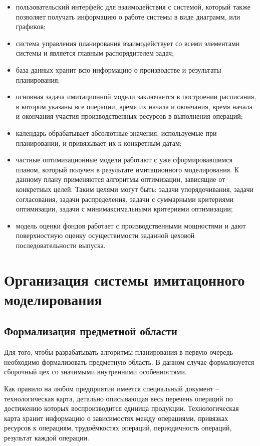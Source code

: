 \begin{itemize}
    \item пользовательский интерфейс для взаимодействия с системой, который также позволяет получать информацию о работе системы в виде диаграмм, или графиков; 
    \item система управления планирования взаимодействует со всеми элементами системы и является главным распорядителем задач;
    \item база данных хранит всю информацию о производстве и результаты планирования; 
    \item основная задача имитационной модели заключается в построении расписания, в котором указаны все операции, время их начала и окончания, время начала и окончания участия производственных ресурсов в выполнения операций;
    \item календарь обрабатывает абсолютные значения, используемые при планировании, и привязывает их к конкретным датам;
    \item частные оптимизационные модели работают с уже сформировавшимся планом, который получен в результате имитационного моделирования. К данному плану применяются алгоритмы оптимизации, зависящие от конкретных целей. Таким целями могут быть: задачи упорядочивания, задачи согласования, задачи распределения, задачи с суммарными критериями оптимизации, задачи с минимаксимальными критериями оптимизации;
    \item модель оценки фондов работает с производственными мощностями и дают поверхностную оценку осуществимости заданной цеховой последовательности выпуска.
\end{itemize}

\section{Организация системы имитацонного моделирования}

\subsection{Формализация предметной области}

Для того, чтобы разрабатывать алгоритмы планирования в первую очередь необходимо формализовать предметную область. В данном случае формализуется сборочный цех со значимыми внутренними особенностями.

Как правило на любом предприятии имеется специальный документ – технологическая карта, детально описывающая весь перечень операций по достижению которых воспроизводится единица продукции. Технологическая карта хранит информацию о зависимостях между операциями, привязках ресурсов к операциям, трудоёмкостях операций, периодичность операций, результат каждой операции. 

